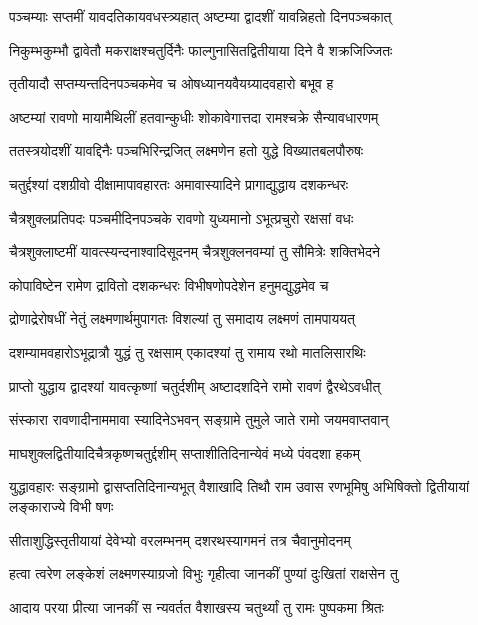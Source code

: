 \twolineshloka
{पञ्चम्याः सप्तमीं यावदतिकायवधस्त्र्यहात्}
{अष्टम्या द्वादशीं यावन्निहतो दिनपञ्चकात्}%

\twolineshloka
{निकुम्भकुम्भौ द्वावेतौ मकराक्षश्चतुर्दिनैः}
{फाल्गुनासितद्वितीयाया दिने वै शक्रजिज्जितः}%

\twolineshloka
{तृतीयादौ सप्तम्यन्तदिनपञ्चकमेव च}
{ओषध्यानयवैयग्र्यादवहारो बभूव ह}%

\twolineshloka
{अष्टम्यां रावणो मायामैथिलीं हतवान्कुधीः}
{शोकावेगात्तदा रामश्चक्रे सैन्यावधारणम्}%

\twolineshloka
{ततस्त्रयोदशीं यावद्दिनैः पञ्चभिरिन्द्रजित्}
{लक्ष्मणेन हतो युद्धे विख्यातबलपौरुषः}%

\twolineshloka
{चतुर्द्दश्यां दशग्रीवो दीक्षामापावहारतः}
{अमावास्यादिने प्रागाद्युद्धाय दशकन्धरः}%

\twolineshloka
{चैत्रशुक्लप्रतिपदः पञ्चमीदिनपञ्चके}
{रावणो युध्यमानो ऽभूत्प्रचुरो रक्षसां वधः}%

\twolineshloka
{चैत्रशुक्लाष्टमीं यावत्स्यन्दनाश्वादिसूदनम्}
{चैत्रशुक्लनवम्यां तु सौमित्रेः शक्तिभेदने}%

\twolineshloka
{कोपाविष्टेन रामेण द्रावितो दशकन्धरः}
{विभीषणोपदेशेन हनुमद्युद्धमेव च}%

\twolineshloka
{द्रोणाद्रेरोषधीं नेतुं लक्ष्मणार्थमुपागतः}
{विशल्यां तु समादाय लक्ष्मणं तामपाययत्}%

\twolineshloka
{दशम्यामवहारोऽभूद्रात्रौ युद्धं तु रक्षसाम्}
{एकादश्यां तु रामाय रथो मातलिसारथिः}%

\twolineshloka
{प्राप्तो युद्धाय द्वादश्यां यावत्कृष्णां चतुर्दशीम्}
{अष्टादशदिने रामो रावणं द्वैरथेऽवधीत्}%

\twolineshloka
{संस्कारा रावणादीनाममावा स्यादिनेऽभवन्}
{सङ्ग्रामे तुमुले जाते रामो जयमवाप्तवान्}%

\twolineshloka
{माघशुक्लद्वितीयादिचैत्रकृष्णचतुर्द्दशीम्}
{सप्ताशीतिदिनान्येवं मध्ये पंवदशा हकम्}%

\threelineshloka
{युद्धावहारः सङ्ग्रामो द्वासप्ततिदिनान्यभूत्}
{वैशाखादि तिथौ राम उवास रणभूमिषु}
{अभिषिक्तो द्वितीयायां लङ्काराज्ये विभी षणः}%

\twolineshloka
{सीताशुद्धिस्तृतीयायां देवेभ्यो वरलम्भनम्}
{दशरथस्यागमनं तत्र चैवानुमोदनम्}%

\twolineshloka
{हत्वा त्वरेण लङ्केशं लक्ष्मणस्याग्रजो विभुः}
{गृहीत्वा जानकीं पुण्यां दुःखितां राक्षसेन तु}%

\twolineshloka
{आदाय परया प्रीत्या जानकीं स न्यवर्तत}
{वैशाखस्य चतुर्थ्यां तु रामः पुष्पकमा श्रितः}%

